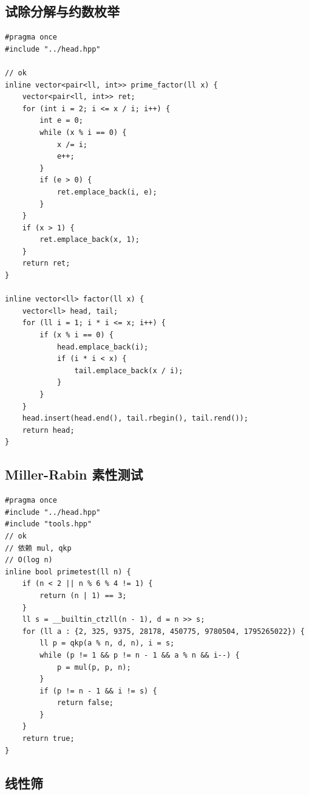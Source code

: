 \subsection{试除分解与约数枚举}
\par

\begin{lstlisting}
#pragma once
#include "../head.hpp"

// ok
inline vector<pair<ll, int>> prime_factor(ll x) {
    vector<pair<ll, int>> ret;
    for (int i = 2; i <= x / i; i++) {
        int e = 0;
        while (x % i == 0) {
            x /= i;
            e++;
        }
        if (e > 0) {
            ret.emplace_back(i, e);
        }
    }
    if (x > 1) {
        ret.emplace_back(x, 1);
    }
    return ret;
}

inline vector<ll> factor(ll x) {
    vector<ll> head, tail;
    for (ll i = 1; i * i <= x; i++) {
        if (x % i == 0) {
            head.emplace_back(i);
            if (i * i < x) {
                tail.emplace_back(x / i);
            }
        }
    }
    head.insert(head.end(), tail.rbegin(), tail.rend());
    return head;
}
\end{lstlisting}

\subsection{Miller-Rabin 素性测试}
\par

\begin{lstlisting}
#pragma once
#include "../head.hpp"
#include "tools.hpp"
// ok
// 依赖 mul, qkp
// O(log n)
inline bool primetest(ll n) {
    if (n < 2 || n % 6 % 4 != 1) {
        return (n | 1) == 3;
    }
    ll s = __builtin_ctzll(n - 1), d = n >> s;
    for (ll a : {2, 325, 9375, 28178, 450775, 9780504, 1795265022}) {
        ll p = qkp(a % n, d, n), i = s;
        while (p != 1 && p != n - 1 && a % n && i--) {
            p = mul(p, p, n);
        }
        if (p != n - 1 && i != s) {
            return false;
        }
    }
    return true;
}
\end{lstlisting}

\subsection{线性筛}
\par


